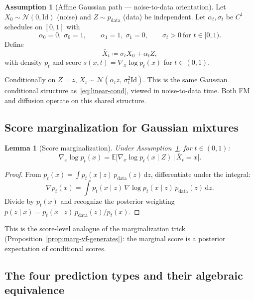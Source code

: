 \documentclass[11pt]{article}
\newcommand{\E}{\mathbb{E}}
\newcommand{\cN}{\mathcal{N}}
\newcommand{\grad}{\nabla}
\newcommand{\Id}{\mathrm{Id}}
\newcommand{\dd}{\,\mathrm{d}}
\newtheorem{lemma}[theorem]{Lemma}
\theoremstyle{definition}
\newtheorem{assumption}[theorem]{Assumption}
\theoremstyle{remark}
\begin{document}
\begin{assumption}[Affine Gaussian path --- noise-to-data orientation]\label{ass:affine-gauss}
Let $X_0\sim\cN(0,\Id)$ (noise) and $Z\sim p_{\mathrm{data}}$ (data) be independent.
Let $\alpha_t, \sigma_t$ be $C^1$ schedules on $[0,1]$ with
\[
\alpha_0 = 0,\;\sigma_0 = 1, \qquad \alpha_1 = 1,\;\sigma_1 = 0, \qquad \sigma_t > 0\ \text{for }t\in[0,1).
\]
Define
\begin{equation}\label{eq:affine-path}
\bar{X}_t \coloneqq \sigma_t X_0 + \alpha_t Z,
\end{equation}
with density $p_t$ and score $s(x,t) = \grad_x\log p_t(x)$ for $t\in(0,1)$.
\end{assumption}

Conditionally on $Z = z$, $\bar{X}_t \sim \cN(\alpha_t z,\,\sigma_t^2\Id)$.
This is the same Gaussian conditional structure as~\eqref{eq:linear-cond}, viewed in noise-to-data time.
Both FM and diffusion operate on this shared structure.

\subsection{Score marginalization for Gaussian mixtures}

\begin{lemma}[Score marginalization]\label{lem:score-marg}
Under Assumption~\ref{ass:affine-gauss}, for $t\in(0,1)$:
\begin{equation}\label{eq:score-marg}
\grad_x\log p_t(x) = \E\!\big[\grad_x\log p_t(x\mid Z)\,\big|\,\bar{X}_t = x\big].
\end{equation}
\end{lemma}

\begin{proof}
From $p_t(x) = \int p_t(x\mid z)\,p_{\mathrm{data}}(z)\dd z$, differentiate under the integral:
\[
\grad p_t(x) = \int p_t(x\mid z)\,\grad\log p_t(x\mid z)\,p_{\mathrm{data}}(z)\dd z.
\]
Divide by $p_t(x)$ and recognize the posterior weighting $p(z\mid x) = p_t(x\mid z)\,p_{\mathrm{data}}(z)/p_t(x)$.
\end{proof}

This is the score-level analogue of the marginalization trick (Proposition~\ref{prop:marg-vf-generates}): the marginal score is a posterior expectation of conditional scores.

\subsection{The four prediction types and their algebraic equivalence}
\end{document}
